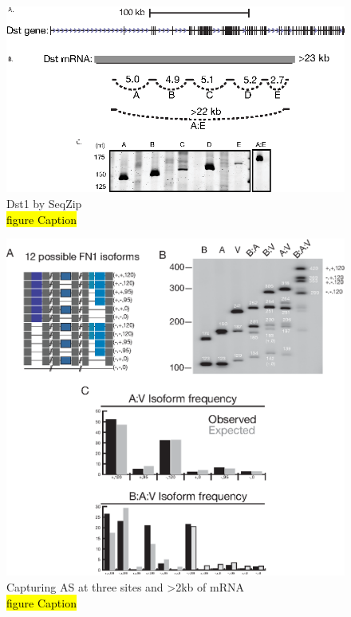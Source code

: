 \begin{figure}[htbp]
	\centering 
	\includegraphics{Figures/Chapter2/dst1.eps}
	\caption[Dst1 by SeqZip]
	{
		Dst1 by SeqZip\\
		\hl{figure Caption}
	}
	\label{fig:Hiv tx via SeqZip}
\end{figure}

\begin{figure}[htbp]
	\centering 
	\includegraphics{Figures/Chapter2/fn1ThreeSite.eps}
	\caption[Three sites of AS in \fn{} by SeqZip]
	{
		Capturing AS at three sites and >2kb of mRNA\\
		\hl{figure Caption}
	}
	\label{fig:Hiv tx via SeqZip}
\end{figure}


